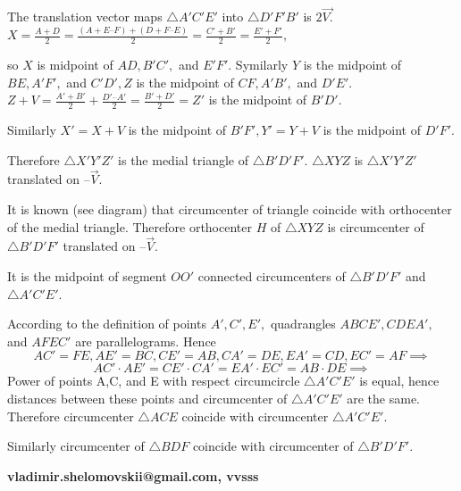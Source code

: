 \begin{enumerate}
 The translation vector maps $\triangle A'C'E'$ into $\triangle D'F'B'$ is $2\vec {V.}$$X = \frac {A+D}{2} =  \frac { (A+ E – F) + (D + F – E)}{2} =  \frac {C' + B'}{2} = \frac {E' + F'}{2},$

 so $X$ is midpoint of $AD, B'C',$ and $E'F'.$ Symilarly $Y$ is the midpoint of $BE, A'F',$ and $C'D', Z$ is the midpoint of $CF, A'B',$ and $D'E'.$$Z + V =  \frac {A' + B'}{2}+ \frac {D' – A'}{2} =  \frac {B' + D'}{2} = Z'$ is the midpoint of $B'D'.$

 Similarly $X' = X + V$  is the midpoint of $B'F',Y'= Y + V$  is the midpoint of $D'F'.$

 Therefore $\triangle X'Y'Z'$ is the medial triangle of $\triangle B'D'F'.$
$\triangle XYZ$ is $\triangle X'Y'Z'$ translated on $– \vec {V}.$

 It is known (see diagram) that circumcenter of triangle coincide with orthocenter of the medial triangle. Therefore  orthocenter $H$ of $\triangle XYZ$ is circumcenter of $\triangle B'D'F'$ translated on $– \vec {V}.$

 It is the midpoint of segment $OO'$ connected circumcenters of $\triangle B'D'F'$ and $\triangle A'C'E'.$

 According to the definition of points $A', C', E',$ quadrangles $ABCE', CDEA',$ and $AFEC'$ are parallelograms. Hence
 \[AC' = FE, AE' = BC, CE' = AB, CA' = DE, EA' = CD, EC' = AF \implies\]
 \[AC' \cdot AE' = CE' \cdot CA' = EA' \cdot EC' = AB \cdot DE \implies\] Power of points A,C, and E with respect circumcircle $\triangle A'C'E'$ is equal, hence distances between these points and circumcenter of $\triangle A'C'E'$ are the same. Therefore circumcenter  $\triangle ACE$ coincide with circumcenter  $\triangle A'C'E'.$

 Similarly circumcenter of $\triangle BDF$ coincide with circumcenter of $\triangle B'D'F'.$

 \textbf{vladimir.shelomovskii@gmail.com, vvsss}

 


\end{enumerate}